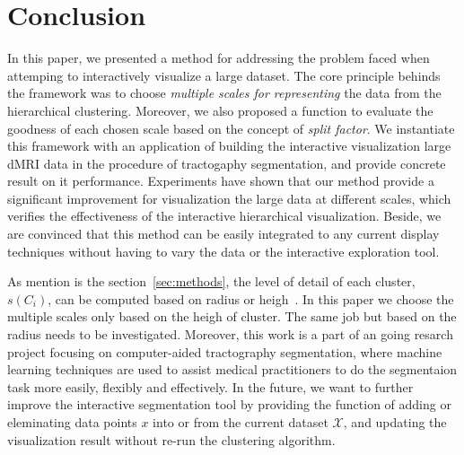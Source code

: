 \vspace{-2mm}
\section{Conclusion}
\label{sec:conclusion}
\vspace{-2mm}
In this paper, we presented a method for addressing the problem faced when attemping to interactively visualize a large dataset. The core principle behinds the framework was to choose \emph{multiple scales for representing} the data from the hierarchical clustering. Moreover, we also proposed a function to evaluate the goodness of each chosen scale based on the concept of \emph{split factor}. We instantiate this framework with an application of building the interactive visualization large dMRI data in the procedure of tractogaphy segmentation, and provide concrete result on it performance. Experiments have shown that our method provide a significant improvement for visualization the large data at different scales, which verifies the effectiveness of the interactive hierarchical visualization. Beside, we are convinced that this method can be easily integrated to any current display techniques without having to vary the data or the interactive exploration tool. 

\vspace{1mm}
As mention is the section~\ref{sec:methods}, the level of detail of each cluster, $s(C_i)$, can be computed based on radius or heigh~\cite{yang2003interactive}. In this paper we choose the multiple scales only based on the heigh of cluster. The same job but based on the radius needs to be investigated. Moreover, this work is a part of an going resarch project focusing on computer-aided tractography segmentation, where machine learning techniques are used to assist medical practitioners to do the segmentaion task more easily, flexibly  and effectively. In the future, we want to further improve the interactive segmentation tool by providing the function of adding or eleminating data points $x$ into or from the current dataset $\mathcal{X}$, and updating the visualization result without re-run the clustering algorithm.

\vspace{-3mm}

